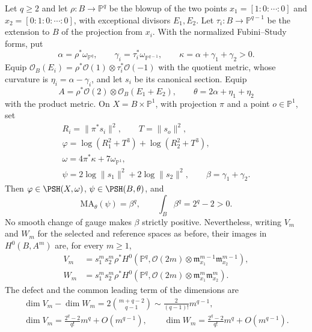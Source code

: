 \begin{example}\label{ex:two-point-semipositive-fiber-series}
Let $q\geq2$ and let $\rho\colon B\to\mathbb P^q$ be the blowup of the two points
$x_1=[1:0:\cdots:0]$ and $x_2=[0:1:0:\cdots:0]$, with exceptional divisors $E_1,E_2$. Let $\tau_i\colon B\to\mathbb P^{q-1}$ be the extension to $B$ of the projection from $x_i$. With the normalized Fubini--Study forms, put
\[
 \alpha=\rho^*\omega_{\mathbb P^q},\qquad
 \gamma_i=\tau_i^*\omega_{\mathbb P^{q-1}},\qquad
 \kappa=\alpha+\gamma_1+\gamma_2>0.
\]
Equip $\mathcal O_B(E_i)=\rho^*\mathcal O(1)\otimes\tau_i^*\mathcal O(-1)$ with the quotient metric, whose curvature is $\eta_i=\alpha-\gamma_i$, and let $s_i$ be its canonical section. Equip
\[
 A=\rho^*\mathcal O(2)\otimes\mathcal O_B(E_1+E_2),
 \qquad \theta=2\alpha+\eta_1+\eta_2
\]
with the product metric. On $X=B\times\mathbb P^1$, with projection $\pi$ and a point $o\in\mathbb P^1$, set
\[
 \begin{gathered}
 R_i=\|\pi^*s_i\|^2,\qquad T=\|s_o\|^2,\\
 \varphi=\log(R_1^2+T^3)+\log(R_2^2+T^3),\\
 \omega=4\pi^*\kappa+7\omega_{\mathbb P^1},\\
 \psi=2\log\|s_1\|^2+2\log\|s_2\|^2,
 \qquad \beta=\gamma_1+\gamma_2.
 \end{gathered}
\]
Then $\varphi\in\PSH(X,\omega)$, $\psi\in\PSH(B,\theta)$, and
\[
 \mathrm{MA}_\theta(\psi)=\beta^q,\qquad
 \int_B\beta^q=2^q-2>0.
\]
No smooth change of gauge makes $\beta$ strictly positive. Nevertheless, writing $V_m$ and $W_m$ for the selected and reference spaces as before, their images in $H^0(B,A^m)$ are, for every $m\geq1$,
\[
 \begin{aligned}
 V_m&=s_1^ms_2^m\rho^*H^0\left(\mathbb P^q,\mathcal O(2m)
                 \otimes\mathfrak m_{x_1}^{m-1}\mathfrak m_{x_2}^{m-1}\right),\\
 W_m&=s_1^ms_2^m\rho^*H^0\left(\mathbb P^q,\mathcal O(2m)
                 \otimes\mathfrak m_{x_1}^{m}\mathfrak m_{x_2}^{m}\right).
 \end{aligned}
\]
The defect and the common leading term of the dimensions are
\[
 \begin{gathered}
 \dim V_m-\dim W_m=2\binom{m+q-2}{q-1}
       \sim\frac{2}{(q-1)!}m^{q-1},\\
 \dim V_m=\frac{2^q-2}{q!}m^q+O(m^{q-1}),\qquad
 \dim W_m=\frac{2^q-2}{q!}m^q+O(m^{q-1}).
 \end{gathered}
\]
\end{example}
